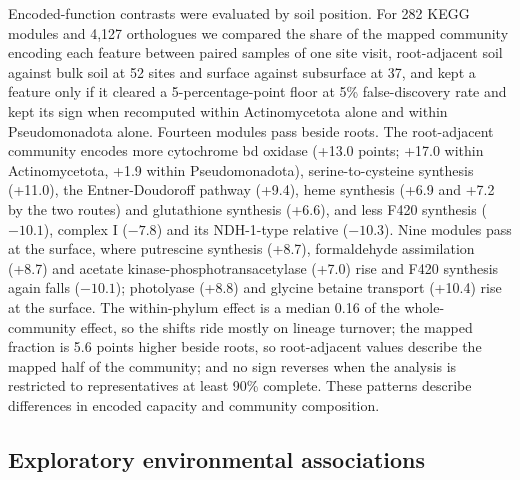 \documentclass[11pt]{article}
\begin{document}
Encoded-function contrasts were evaluated by soil position. For 282 KEGG modules and 4{,}127
orthologues we compared the share of the mapped community encoding each feature between paired
samples of one site visit, root-adjacent soil against bulk soil at 52 sites and surface against
subsurface at 37, and kept a feature only if it cleared a 5-percentage-point floor at 5\%
false-discovery rate and kept its sign when recomputed within Actinomycetota alone and within
Pseudomonadota alone. Fourteen modules pass beside roots. The root-adjacent community encodes more
cytochrome bd oxidase (+13.0 points; +17.0 within Actinomycetota, +1.9 within Pseudomonadota),
serine-to-cysteine synthesis (+11.0), the Entner-Doudoroff pathway (+9.4), heme synthesis (+6.9 and
+7.2 by the two routes) and glutathione synthesis (+6.6), and less F420 synthesis ($-10.1$), complex I
($-7.8$) and its NDH-1-type relative ($-10.3$).
Nine modules pass at
the surface, where putrescine synthesis (+8.7), formaldehyde assimilation (+8.7) and acetate
kinase-phosphotransacetylase (+7.0) rise and F420 synthesis again falls ($-10.1$); photolyase
(+8.8) and glycine betaine transport (+10.4) rise at the surface. The within-phylum effect is a
median 0.16 of the whole-community effect, so the shifts ride mostly on lineage turnover; the mapped
fraction is 5.6 points higher beside roots, so root-adjacent values describe the mapped half of the
community; and no sign reverses when the analysis is restricted to representatives at least 90\%
complete. These patterns describe differences in encoded capacity and community composition.

\subsection*{Exploratory environmental associations}
\end{document}
